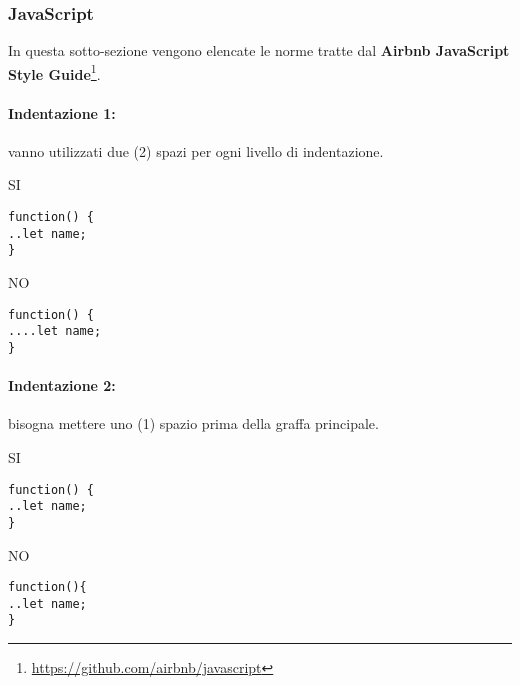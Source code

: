 \documentclass[../ProcessiPrimari.tex]{subfiles}
\begin{document}
	
	\subsubsection{JavaScript}
	In questa sotto-sezione vengono elencate le norme tratte dal \textbf{Airbnb JavaScript Style Guide}\footnote{\href{https://github.com/airbnb/javascript}{https://github.com/airbnb/javascript}}.
	
	\paragraph*{Indentazione 1: }
	vanno utilizzati due (2) spazi per ogni livello di indentazione.
	
	\begin{center}{
	\begin{minipage}{4cm}
		{\begin{center}SI\end{center}}
		\begin{Verbatim}[frame=single]
function() {
..let name;
}
		\end{Verbatim}
	\end{minipage}
	\hfil
	\begin{minipage}{4cm}
		{\begin{center}NO\end{center}}
		\begin{Verbatim}[frame=single]
function() {
....let name;
}
		\end{Verbatim}
	\end{minipage}
	}
	\end{center}
	
	\paragraph*{Indentazione 2: }
	bisogna mettere uno (1) spazio prima della graffa principale.	
	\begin{center}{	
	\begin{minipage}{4cm}
		{\begin{center}SI\end{center}}
		\begin{Verbatim}[frame=single]
function() {
..let name;
}
		\end{Verbatim}
	\end{minipage}
	\hfil
	\begin{minipage}{4cm}
		{\begin{center}NO\end{center}}
		\begin{Verbatim}[frame=single]
function(){
..let name;
}
		\end{Verbatim}
	\end{minipage}
	}
	\end{center}	
\end{document}
